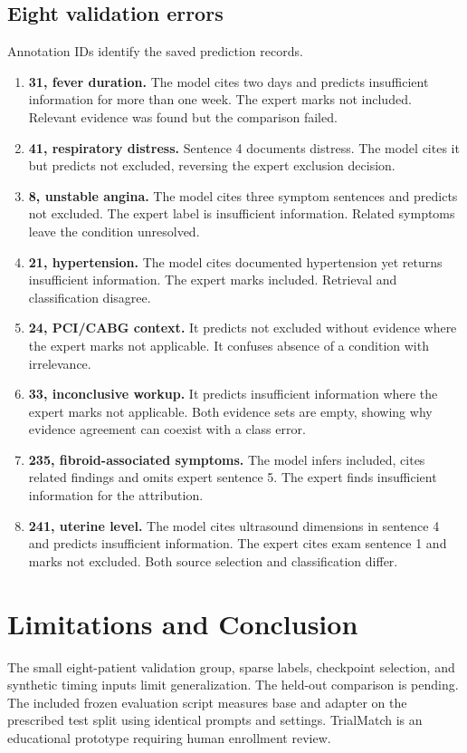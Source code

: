 \documentclass[conference]{IEEEtran}
\begin{document}
\subsection{Eight validation errors}
Annotation IDs identify the saved prediction records.
\begin{enumerate}
\item \textbf{31, fever duration.} The model cites two days and predicts insufficient information for more than one week. The expert marks not included. Relevant evidence was found but the comparison failed.
\item \textbf{41, respiratory distress.} Sentence 4 documents distress. The model cites it but predicts not excluded, reversing the expert exclusion decision.
\item \textbf{8, unstable angina.} The model cites three symptom sentences and predicts not excluded. The expert label is insufficient information. Related symptoms leave the condition unresolved.
\item \textbf{21, hypertension.} The model cites documented hypertension yet returns insufficient information. The expert marks included. Retrieval and classification disagree.
\item \textbf{24, PCI/CABG context.} It predicts not excluded without evidence where the expert marks not applicable. It confuses absence of a condition with irrelevance.
\item \textbf{33, inconclusive workup.} It predicts insufficient information where the expert marks not applicable. Both evidence sets are empty, showing why evidence agreement can coexist with a class error.
\item \textbf{235, fibroid-associated symptoms.} The model infers included, cites related findings and omits expert sentence 5. The expert finds insufficient information for the attribution.
\item \textbf{241, uterine level.} The model cites ultrasound dimensions in sentence 4 and predicts insufficient information. The expert cites exam sentence 1 and marks not excluded. Both source selection and classification differ.
\end{enumerate}
\section{Limitations and Conclusion}
The small eight-patient validation group, sparse labels, checkpoint selection, and synthetic timing inputs limit generalization. The held-out comparison is pending. The included frozen evaluation script measures base and adapter on the prescribed test split using identical prompts and settings. TrialMatch is an educational prototype requiring human enrollment review.
\appendices
\end{document}
